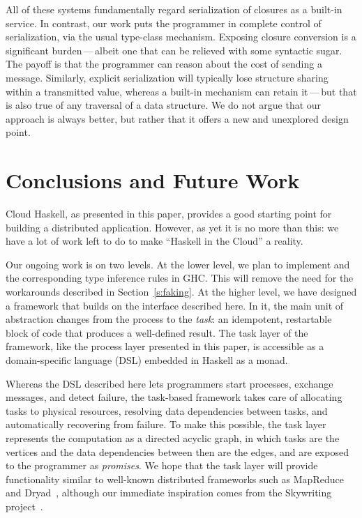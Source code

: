 \documentclass[preprint]{sigplanconf}
\begin{document}
All of these systems fundamentally regard serialization of closures
as a built-in service.  In contrast, our work puts the programmer in
complete control of serialization, via the usual type-class mechanism.
Exposing closure conversion is a significant burden\,---\,albeit one that can be
relieved with some syntactic sugar.  The payoff is that the 
programmer can reason about the cost of sending a message.
Similarly, explicit serialization will typically lose structure 
sharing within a transmitted value, whereas a built-in mechanism can retain it\,---\,but that is also true of any traversal of a data structure.
We do not argue that our approach is always better, but rather that it offers
a new and unexplored design point.

\section{Conclusions and Future Work}
\label{s:futureWork}
Cloud Haskell, as presented in this paper, provides a good starting point for building a distributed application.  
However, as yet it is no more than this: we have a lot of work left to do to make ``Haskell in the Cloud'' a reality.

Our ongoing work is on two levels.
At the lower level, we plan to implement  and the corresponding type inference rules in GHC.  This will remove the need for the workarounds described in Section~\ref{s:faking}.
At the higher level, we have designed a framework that builds on the interface described here.
In it, the main unit of abstraction changes from the process to the \emph{task}: an idempotent, restartable block of code that produces a well-defined result. The task layer of the framework, like the process layer presented in this paper, is accessible as a domain-specific language (DSL) embedded in Haskell as a monad.

Whereas the DSL described here lets programmers start processes, exchange messages, and detect failure, the task-based framework takes care of allocating tasks to physical resources, resolving data dependencies between tasks, and automatically recovering from failure. 
To make this possible, the task layer represents the computation as a directed acyclic graph, in which tasks are the vertices and the data dependencies between then are the edges, and are exposed to the programmer as \emph{promises}.
We hope that the task layer will provide functionality similar to well-known distributed frameworks such as MapReduce~\cite{MapReduce2008} and Dryad~\cite{Dryad2007}, although our immediate inspiration comes from the Skywriting project~\cite{Murray2010,Murray2011}.
\end{document}
